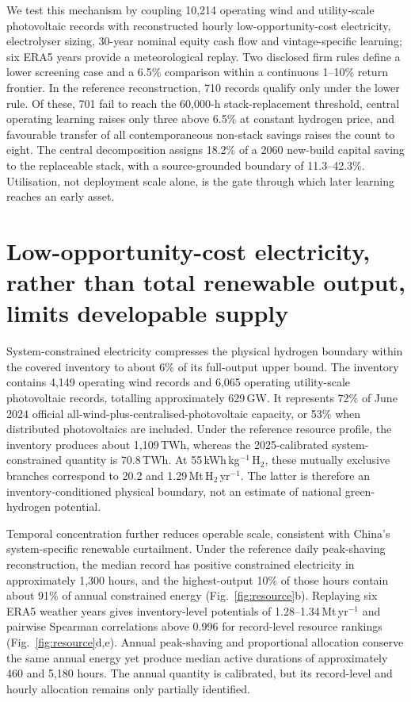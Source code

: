 \documentclass[11pt,a4paper]{article}
\begin{document}
We test this mechanism by coupling 10,214 operating wind and utility-scale photovoltaic records with reconstructed hourly low-opportunity-cost electricity, electrolyser sizing, 30-year nominal equity cash flow and vintage-specific learning; six ERA5 years provide a meteorological replay. Two disclosed firm rules define a lower screening case and a 6.5\% comparison within a continuous 1--10\% return frontier\cite{changyuan2026,chinabond2026,huadian2025}. In the reference reconstruction, 710 records qualify only under the lower rule. Of these, 701 fail to reach the 60,000-h stack-replacement threshold, central operating learning raises only three above 6.5\% at constant hydrogen price, and favourable transfer of all contemporaneous non-stack savings raises the count to eight. The central decomposition assigns 18.2\% of a 2060 new-build capital saving to the replaceable stack, with a source-grounded boundary of 11.3--42.3\%. Utilisation, not deployment scale alone, is the gate through which later learning reaches an early asset.

\section*{Low-opportunity-cost electricity, rather than total renewable output, limits developable supply}

System-constrained electricity compresses the physical hydrogen boundary within the covered inventory to about 6\% of its full-output upper bound. The inventory contains 4,149 operating wind records and 6,065 operating utility-scale photovoltaic records, totalling approximately 629\,GW. It represents 72\% of June 2024 official all-wind-plus-centralised-photovoltaic capacity, or 53\% when distributed photovoltaics are included. Under the reference resource profile, the inventory produces about 1,109\,TWh, whereas the 2025-calibrated system-constrained quantity is 70.8\,TWh. At 55\,kWh\,kg$^{-1}$\,H$_2$, these mutually exclusive branches correspond to 20.2 and 1.29\,Mt\,H$_2$\,yr$^{-1}$. The latter is therefore an inventory-conditioned physical boundary, not an estimate of national green-hydrogen potential.

Temporal concentration further reduces operable scale, consistent with China's system-specific renewable curtailment\cite{guo2023grid}. Under the reference daily peak-shaving reconstruction, the median record has positive constrained electricity in approximately 1,300 hours, and the highest-output 10\% of those hours contain about 91\% of annual constrained energy (Fig.~\ref{fig:resource}b). Replaying six ERA5 weather years gives inventory-level potentials of 1.28--1.34\,Mt\,yr$^{-1}$ and pairwise Spearman correlations above 0.996 for record-level resource rankings (Fig.~\ref{fig:resource}d,e). Annual peak-shaving and proportional allocation conserve the same annual energy yet produce median active durations of approximately 460 and 5,180 hours. The annual quantity is calibrated, but its record-level and hourly allocation remains only partially identified.
\end{document}
